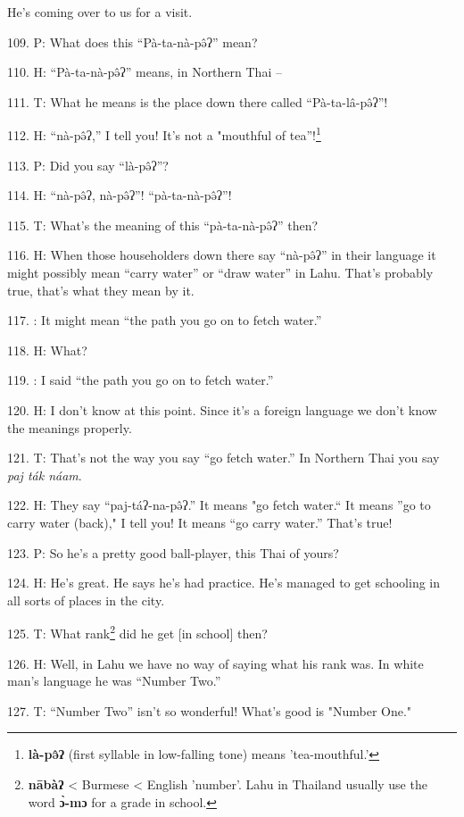 He's coming over to us for a visit.

109. P: What does this ``Pà-ta-nà-pə̂ʔ'' mean?

110. H: ``Pà-ta-nà-pə̂ʔ'' means, in Northern Thai --

111. T: What he means is the place down there called ``Pà-ta-lâ-pə̂ʔ''!

112. H: ``nà-pə̂ʔ,'' I tell you! It's not a "mouthful
of tea''!\footnote{\textbf{là-pə̂ʔ} (first syllable in low-falling tone) means 'tea-mouthful.'}

113. P: Did you say ``là-pə̂ʔ''?

114. H: ``nà-pə̂ʔ, nà-pə̂ʔ''! ``pà-ta-nà-pə̂ʔ''!

115. T: What's the meaning of this ``pà-ta-nà-pə̂ʔ'' then?

116. H: When those householders down there say ``nà-pə̂ʔ'' in
their language it might possibly mean ``carry water'' or ``draw water'' in Lahu.
That's probably true, that's what they mean by it.

117. : It might mean ``the path you go on to fetch water.''

118. H: What?

119. : I said ``the path you go on to fetch water.''

120. H: I don't know at this point. Since it's a foreign language we don't know
the meanings properly.

121. T: That's not the way you say ``go fetch water.'' In Northern
Thai you say \textit{paj ták náam}.

122. H: They say ``paj-táʔ-na-pə̂ʔ.'' It means "go
fetch water.`` It means ''go to carry water (back)," I
tell you! It means ``go carry water.'' That's true!


123. P: So he's a pretty good ball-player, this Thai of yours?

124. H: He's great. He says he's had practice. He's managed to get schooling in
all sorts of places in the city.

125. T: What rank\footnote{\textbf{nābàʔ} < Burmese < English 'number'. Lahu in Thailand usually use the word \textbf{ɔ̀-mɔ} for a grade in school.} did he get [in school] then?

126. H: Well, in Lahu we have no way of saying what his rank was. In white man's
language he was ``Number Two.''

127. T: ``Number Two'' isn't so wonderful! What's good is "Number
One."

